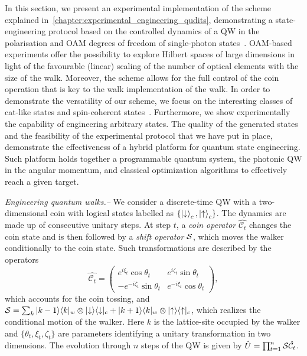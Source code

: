 In this section, we present an experimental implementation of the scheme explained in~\cref{chapter:experimental_engineering_qudits}, demonstrating a state-engineering protocol based on the controlled dynamics of a \ac{QW} in the polarisation and \ac{OAM} degrees of freedom of single-photon states~\cite{zhang2010implementation,goyal2013implementing,cardano2015quantum}. \ac{OAM}-based experiments offer the possibility to explore Hilbert spaces of large dimensions in light of the favourable (linear) scaling of the number of optical elements with the size of the walk. Moreover, the scheme allows for the full control of the coin operation that is key to the walk implementation of the walk. In order to demonstrate the versatility of our scheme, we focus on the interesting classes of cat-like states and spin-coherent states~\cite{brune1992manipulation,monroe1996schrodinger}. Furthermore, we show experimentally the capability of engineering arbitrary states.
The quality of the generated states and the feasibility of the experimental protocol that we have put in place, demonstrate the effectiveness of a hybrid platform for quantum state engineering. Such platform holds together a programmable quantum system, the photonic \ac{QW} in the angular momentum, and classical optimization algorithms to effectively reach a given target. 

\textit{Engineering quantum walks.--}
We consider a discrete-time \ac{QW} with a two-dimensional coin with logical states labelled as $\{\ket{\downarrow}_c, \ket{{\uparrow}}_c\}$. The dynamics are made up of consecutive unitary steps. At step $t$, a \emph{coin operator} $\hat{\mathcal{C}_{t}}$ changes the coin state and is then followed by a \emph{shift operator} ${\mathcal{S}}$, which moves the walker conditionally to the coin state. Such transformations are described by the operators
\begin{equation}
\hat{\mathcal{C}_t}=
\left(
\begin{array}{ll}
e^{i \xi_t} \cos{\theta_t} &  e^{i \zeta_t} \sin{\theta_t} \\
-e^{-i \zeta_t} \sin{\theta_t} & e^{-i \xi_t} \cos{\theta_t}
\end{array}
\right),
\label{coinExpr}
\end{equation}
which accounts for the coin tossing, and
${\mathcal{S}}=\sum_k |k-1\rangle \langle k|_w\otimes |{\downarrow}\rangle \langle {\downarrow}|_c+ |k+1\rangle \langle k|_w\otimes |{\uparrow}\rangle \langle{\uparrow}|_c$,
which realizes the conditional motion of the walker. Here $k$ is the lattice-site occupied by the walker and $\{\theta_t,\xi_t,\zeta_t \}$ are parameters identifying a unitary transformation in two dimensions. The evolution through $n$ steps of the {QW} is given by $\hat{U}=\prod_{t=1}^n {\mathcal{S}}\hat{{\mathcal{C}}_t}$.

